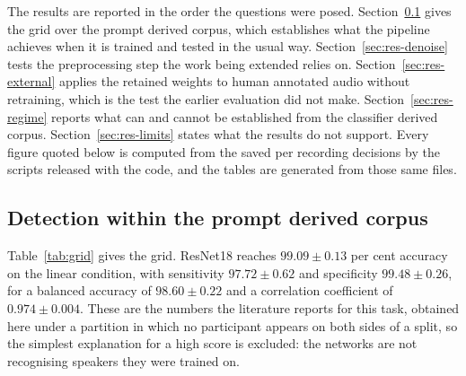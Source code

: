 \documentclass{ieeeaccess}
\begin{document}
The results are reported in the order the questions were posed.
Section~\ref{sec:res-grid} gives the grid over the prompt derived corpus, which establishes
what the pipeline achieves when it is trained and tested in the usual way.
Section~\ref{sec:res-denoise} tests the preprocessing step the work being extended relies
on. Section~\ref{sec:res-external} applies the retained weights to human annotated audio
without retraining, which is the test the earlier evaluation did not make.
Section~\ref{sec:res-regime} reports what can and cannot be established from the
classifier derived corpus. Section~\ref{sec:res-limits} states what the results do not
support. Every figure quoted below is computed from the saved per recording decisions by
the scripts released with the code, and the tables are generated from those same files.

\subsection{Detection within the prompt derived corpus}\label{sec:res-grid}

Table~\ref{tab:grid} gives the grid. ResNet18 reaches $99.09 \pm 0.13$ per cent accuracy
on the linear condition, with sensitivity $97.72 \pm 0.62$ and specificity
$99.48 \pm 0.26$, for a balanced accuracy of $98.60 \pm 0.22$ and a correlation
coefficient of $0.974 \pm 0.004$. These are the numbers the literature reports for this
task, obtained here under a partition in which no participant appears on both sides of a
split, so the simplest explanation for a high score is excluded: the networks are not
recognising speakers they were trained on.
\end{document}
